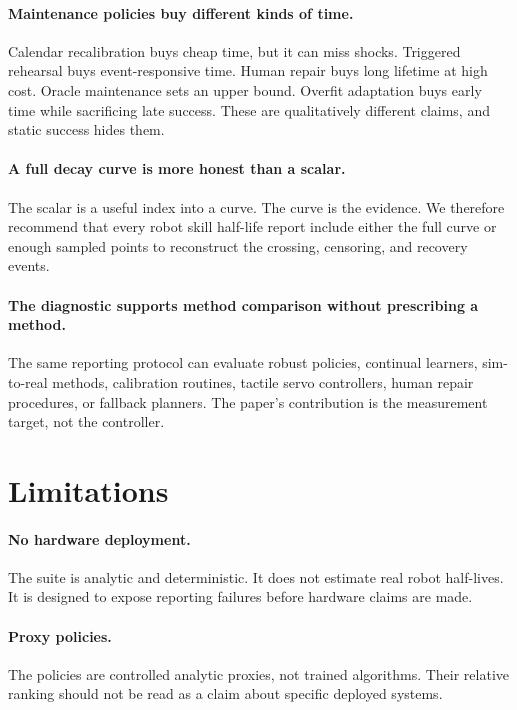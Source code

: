\documentclass{article}
\begin{document}
\paragraph{Maintenance policies buy different kinds of time.}
Calendar recalibration buys cheap time, but it can miss shocks. Triggered
rehearsal buys event-responsive time. Human repair buys long lifetime at high
cost. Oracle maintenance sets an upper bound. Overfit adaptation buys early
time while sacrificing late success. These are qualitatively different claims,
and static success hides them.

\paragraph{A full decay curve is more honest than a scalar.}
The scalar is a useful index into a curve. The curve is the evidence. We
therefore recommend that every robot skill half-life report include either the
full curve or enough sampled points to reconstruct the crossing, censoring, and
recovery events.

\paragraph{The diagnostic supports method comparison without prescribing a method.}
The same reporting protocol can evaluate robust policies, continual learners,
sim-to-real methods, calibration routines, tactile servo controllers, human
repair procedures, or fallback planners. The paper's contribution is the
measurement target, not the controller.

\section{Limitations}

\paragraph{No hardware deployment.}
The suite is analytic and deterministic. It does not estimate real robot
half-lives. It is designed to expose reporting failures before hardware claims
are made.

\paragraph{Proxy policies.}
The policies are controlled analytic proxies, not trained algorithms. Their
relative ranking should not be read as a claim about specific deployed systems.
\end{document}

